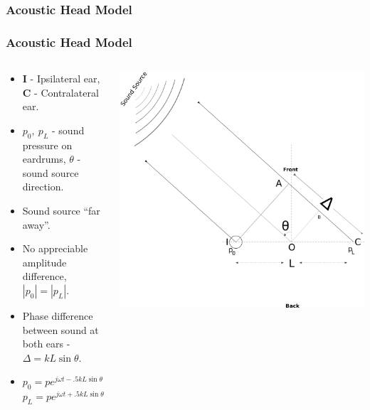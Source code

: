 \documentclass{beamer}
\begin{document}
\subsubsection{Acoustic Head Model}
\begin{frame}[t]
 \frametitle{Acoustic Head Model}
 \begin{columns}
     \begin{column}{.5\textwidth}
    \small
    \flushleft
     \begin{itemize}
      \item<1> \textbf{I} - Ipsilateral ear, \textbf{C} - Contralateral ear.
      \item<1>  $p_0,\ p_L$ - sound pressure on eardrums,
      $\theta$ - sound source direction.
     \end{itemize}
     
     \begin{itemize}
      \item<2> Sound source ``far away''.
      \item<2> No appreciable amplitude difference, $|p_0|=|p_L|$.
      \item<2> Phase difference between sound at both ears - $\Delta=kL\sin\theta$.
      \item<3> $p_0=pe^{j\omega t -.5kL\sin\theta}$\\ $p_L=pe^{j\omega t +.5kL\sin\theta}$
      \end{itemize}

    \end{column}
    
 \begin{column}{0.5\textwidth}
    \includegraphics[width = 6 cm]{Diagrams/Presentation/acousticheadmodelold.png}\\
    \end{column}

    \end{columns}
\end{frame}
\end{document}
